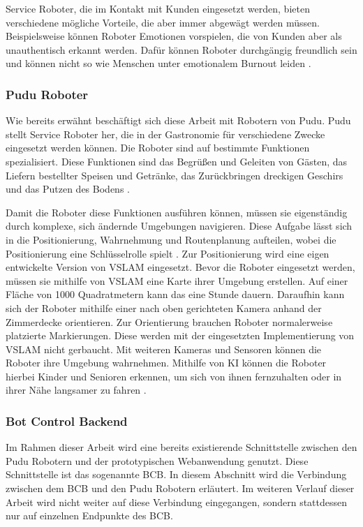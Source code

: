 Service Roboter, die im Kontakt mit Kunden eingesetzt werden, bieten verschiedene mögliche Vorteile, die aber immer abgewägt werden müssen. Beispielsweise können Roboter Emotionen vorspielen, die von Kunden aber als unauthentisch erkannt werden. Dafür können Roboter durchgängig freundlich sein und können nicht so wie Menschen unter emotionalem Burnout leiden \cite[S.~427]{Paluch2020}. 

\subsubsection{Pudu Roboter}

Wie bereits erwähnt beschäftigt sich diese Arbeit mit Robotern von Pudu. Pudu stellt Service Roboter her, die in der Gastronomie für verschiedene Zwecke eingesetzt werden können. Die Roboter sind auf bestimmte Funktionen spezialisiert. Diese Funktionen sind das Begrüßen und Geleiten von Gästen, das Liefern bestellter Speisen und Getränke, das Zurückbringen dreckigen Geschirs und das Putzen des Bodens \cite{PUDU2024}.

Damit die Roboter diese Funktionen ausführen können, müssen sie eigenständig durch komplexe, sich ändernde Umgebungen navigieren. Diese Aufgabe lässt sich in die Positionierung, Wahrnehmung und Routenplanung aufteilen, wobei die Positionierung eine Schlüsselrolle spielt \cite{Nature2022}. Zur Positionierung wird eine eigen entwickelte Version von \ac{VSLAM} eingesetzt. Bevor die Roboter eingesetzt werden, müssen sie mithilfe von \ac{VSLAM} eine Karte ihrer Umgebung erstellen. Auf einer Fläche von 1000 Quadratmetern kann das eine Stunde dauern. Daraufhin kann sich der Roboter mithilfe einer nach oben gerichteten Kamera anhand der Zimmerdecke orientieren. Zur Orientierung brauchen Roboter normalerweise platzierte Markierungen. Diese werden mit der eingesetzten Implementierung von \ac{VSLAM} nicht gerbaucht.\cite{Pudu2023} Mit weiteren Kameras und Sensoren können die Roboter ihre Umgebung wahrnehmen. Mithilfe von KI können die Roboter hierbei Kinder und Senioren erkennen, um sich von ihnen fernzuhalten oder in ihrer Nähe langsamer zu fahren \cite{Nature2022}.

\subsubsection{Bot Control Backend}
Im Rahmen dieser Arbeit wird eine bereits existierende Schnittstelle zwischen den Pudu Robotern und der prototypischen Webanwendung genutzt. Diese Schnittstelle ist das sogenannte \ac{BCB}. In diesem Abschnitt wird die Verbindung zwischen dem \ac{BCB} und den Pudu Robotern erläutert. Im weiteren Verlauf dieser Arbeit wird nicht weiter auf diese Verbindung eingegangen, sondern stattdessen nur auf einzelnen Endpunkte des \ac{BCB}.

